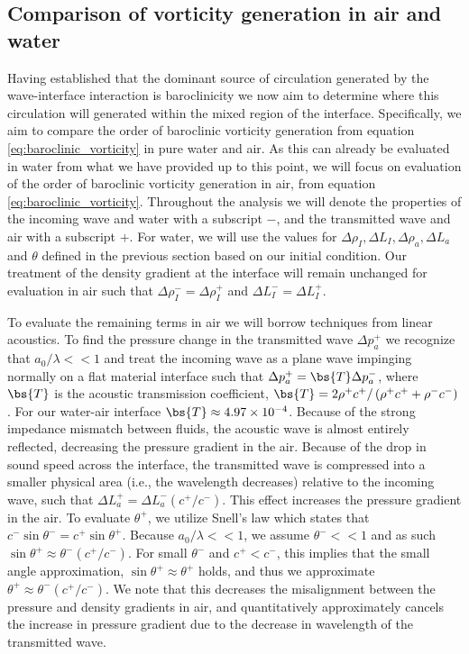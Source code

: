 \subsection{Comparison of vorticity generation in air and water}
Having established that the dominant source of circulation generated
by the wave-interface interaction is baroclinicity we now aim to
determine where this circulation will generated within the mixed
region of the interface. Specifically, we aim to compare the order of
baroclinic vorticity generation from equation
\eqref{eq:baroclinic_vorticity} in pure water and air. As this can
already be evaluated in water from what we have provided up to this
point, we will focus on evaluation of the order of baroclinic
vorticity generation in air, from equation
\eqref{eq:baroclinic_vorticity}. Throughout the analysis we will
denote the properties of the incoming wave and water with a subscript
$-$, and the transmitted wave and air with a subscript $+$. For water,
we will use the values for
$\Delta \rho_I, \Delta L_I, \Delta \rho_a, \Delta L_a$ and $\theta$
defined in the previous section based on our initial condition. Our
treatment of the density gradient at the interface will remain
unchanged for evaluation in air such that
$\Delta \rho_I^-=\Delta \rho_I^+$ and $\Delta L_I^-=\Delta L_I^+$.

To evaluate the remaining terms in air we will borrow techniques from
linear acoustics. To find the pressure change in the transmitted wave
$\Delta p_a^+$ we recognize that $a_0/\lambda<<1$ and treat the
incoming wave as a plane wave impinging normally on a flat material
interface such that $\Delta p_a^+=\bs{T} \Delta p_a^-$, where $\bs{T}$
is the acoustic transmission coefficient,
$\bs{T}=2\rho^+ c^+/\left(\rho^+ c^+ + \rho^- c^- \right)$
\citep{Kinsler1982}. For our water-air interface
$\bs{T}\approx4.97\times10^{-4}$. Because of the strong impedance
mismatch between fluids, the acoustic wave is almost entirely
reflected, decreasing the pressure gradient in the air. Because of the
drop in sound speed across the interface, the transmitted wave is
compressed into a smaller physical area (i.e., the wavelength
decreases) relative to the incoming wave, such that
$\Delta L_a^+=\Delta L_a^- (c^+/c^-)$. This effect increases the
pressure gradient in the air. To evaluate $\theta^+$, we utilize
Snell's law which states that
$c^-\sin{\theta^-}=c^+\sin{\theta^+}$. Because $a_0/\lambda<<1$, we
assume $\theta^-<<1$ and as such
$\sin{\theta^+}\approx\theta^-(c^+/c^-)$. For small $\theta^-$ and
$c^+<c^-$, this implies that the small angle approximation,
$\sin{\theta^+}\approx\theta^+$ holds, and thus we approximate
$\theta^+\approx\theta^-(c^+/c^-)$. We note that this decreases the
misalignment between the pressure and density gradients in air, and
quantitatively approximately cancels the increase in pressure gradient
due to the decrease in wavelength of the transmitted wave.

